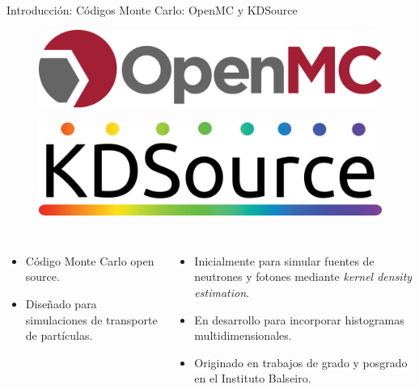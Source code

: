 \documentclass[aspectratio=169,english]{beamer}
\begin{document}
\begin{frame}{Introducción: Códigos Monte Carlo: OpenMC y KDSource}
    \begin{figure}
        \centering
        \begin{minipage}{0.35\textwidth}
            \centering
            \includegraphics[width=\linewidth]{imagens/openmc.png}
            \label{fig:openmc}
        \end{minipage}\hfill
        \begin{minipage}{0.35\textwidth}
            \centering
            \includegraphics[width=\linewidth]{imagens/esquema3.png}
            \label{fig:esquema3}
        \end{minipage}
    \end{figure}

    \begin{columns}[t]
            \begin{itemize}
                \item Código Monte Carlo open source.
                \item Diseñado para simulaciones de transporte de partículas.
            \end{itemize}
            \begin{itemize}
                \item Inicialmente para simular fuentes de neutrones y fotones mediante \textit{kernel density estimation}.
                \item En desarrollo para incorporar histogramas multidimensionales.
                \item Originado en trabajos de grado y posgrado en el Instituto Balseiro.
            \end{itemize}
    \end{columns}
\end{frame}
\end{document}
